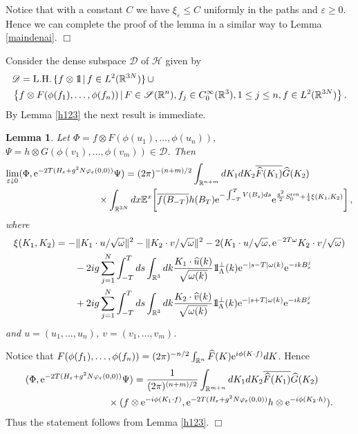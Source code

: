\documentclass[12pt]{article}
\newtheorem{lemma}[theorem]{Lemma}
\newcommand{\bl}[1]{\begin{lemma}\label{#1}}
\newcommand{\el}{\end{lemma}}
\def\bbbone{{\mathchoice {\rm 1\mskip-4mu l} {\rm 1\mskip-4mu l}
{\rm 1\mskip-4.5mu l} {\rm 1\mskip-5mu l}}}
\def\one{\bbbone}
\newcommand{\kp}{\one_\Lambda^\perp(k)}
\newcommand{\Ebb}{{\mathbb E}}
\providecommand{\qed}{\hfill {$\Box$}\par\medskip}
\providecommand{\BR}{{\mathbb{R}^3 }}
\providecommand{\BRN}{{\mathbb{R}^{3N} }}
\providecommand{\RR}{\mathbb{R}}
\providecommand{\LRN}{{L^2(\BRN)}}
\providecommand{\D}{{\ms D}}
\providecommand{\hn}{H}%
\providecommand{\ms}[1]{\mathscr{#1}}
\providecommand{\lkk}{\left\{}
\providecommand{\rkk}{\right\}}
\providecommand{\ov}[1]{\overline{#1}}
\providecommand{\hhh}{\ms H} %
\providecommand{\non}{\nonumber}
\providecommand{\e}{{\rm e}}
\providecommand{\1}{\mathbb{1}}
\providecommand {\D}  {\ensuremath {\mathcal{D}}}
\providecommand{\eps}{\varepsilon}
\providecommand{\ren}{{\rm ren}}
\newcounter {constant}
\begin{document}
Notice that with a constant $C$ we have $\xi_\eps\leq C$ uniformly in the paths and $\eps\geq0$. Hence
we can complete the proof of the lemma in a similar way to Lemma \ref{maindenai}.
\qed
Consider the dense subspace  $\D$ of  $\hhh$ given by
\begin{align*}
&\D={\rm L.H.}\, \{f\otimes \one \,|\, f\in\LRN\} \, \cup \\
&
\lkk f\otimes F(\phi(f_1),\ldots,\phi(f_n)) \,|\, F\in \ms S(\RR^n),
f_j\in C_0^\infty(\BR), 1\leq j\leq n,
 f\in\LRN \rkk.
\end{align*}
By Lemma \ref{h123} the next result is immediate.
\bl{h2}
Let $\Phi=f\otimes F(\phi(u_1),\ldots,\phi(u_n))$, $\Psi=h\otimes G(\phi(v_1),\ldots,\phi(v_m)) \in \D$.
Then
\begin{align}
\lim_{\eps\downarrow0}
(\Phi, \e^{-2T (\hn_\eps+g^2 N\varphi_\eps(0,0))} \Psi)
&=
(2\pi)^{-(n+m)/2} \int_{\RR^{n+m}}dK_1 dK_2 \ov{\widehat F(K_1)} \widehat G(K_2) \non \\
& \hspace{-1cm}\times
\int_{\BRN} dx   \Ebb^x\!\left[\ov{f(B_{-T})} h(B_T) \e^{-\int_{-T}^T V(B_s) ds} \e^{\frac{g^2}{2}
S_0^\ren + \frac{1}{4} \xi(K_1,K_2)} \right],
\label{310}
\end{align}
where
\begin{align*}
\xi(K_1,K_2)
&=
-\|K_1\cdot u/\sqrt\omega\|^2 -\|K_2\cdot v /\sqrt\omega\|^2 -
2 (K_1 \cdot u/\sqrt\omega, \e^{-2T\omega} K_2 \cdot v/\sqrt\omega)\\
& \qquad
- 2i g \sum_{j=1}^N \int_{-T}^Tds \int_\BR dk
\frac{K_1\cdot \widehat u(k)}{\sqrt{\omega(k)}}\kp \e^{-|s-T|\omega(k)}\e^{-ikB_s^j} \\
&
\qquad + 2i g \sum_{j=1}^N \int_{-T}^Tds \int_\BR dk
\frac{K_2\cdot \widehat v(k)}{\sqrt{\omega(k)}}\kp \e^{-|s+T|\omega(k)}\e^{-ikB_s^j}
\end{align*}
and $u=(u_1,...,u_n)$, $v=(v_1,...,v_m)$.
\el
\proof
Notice that $F(\phi(f_1),\ldots,\phi(f_n))
=(2\pi)^{-n/2} \int_{\RR^n} \widehat F(K)
\e^{i\phi (K\cdot f)} dK$.
Hence
\begin{align*}
& (\Phi, \e^{-2T(\hn_\eps+g^2 N \varphi_\eps(0,0))} \Psi)
= \frac{1}{(2\pi)^{(n+m)/2}}
\int_{\RR^{m+n}}
dK_1dK_2\ov{\widehat F(K_1)} \widehat G(K_2)\\
&\hspace{3cm}\times (f\otimes \e^{-i\phi(K_1\cdot f)},
\e^{-2T(\hn_\eps+g^2 N \varphi_\eps(0,0))}
h\otimes \e^{-i\phi(K_2\cdot h)}).
\end{align*}
Thus the statement follows from Lemma \ref{h123}.
\qed
\end{document}
